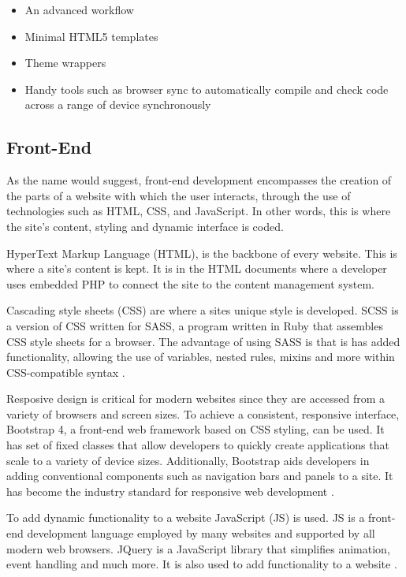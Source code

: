 \documentclass[fontsize=11pt]{extarticle}
\numberwithin{figure}{section} %
\providecommand{\tightlist}{%
  \setlength{\itemsep}{0pt}\setlength{\parskip}{0pt}}
\begin{document}
\begin{itemize}
\tightlist
\item
  An advanced workflow
\item
  Minimal HTML5 templates
\item
  Theme wrappers
\item
  Handy tools such as browser sync to automatically compile and check
  code across a range of device synchronously
\end{itemize}

\hypertarget{front-end}{%
\subsection{Front-End}\label{front-end}}

As the name would suggest, front-end development encompasses the
creation of the parts of a website with which the user interacts,
through the use of technologies such as HTML, CSS, and JavaScript. In
other words, this is where the site's content, styling and dynamic
interface is coded.

HyperText Markup Language (HTML), is the backbone of every website. This
is where a site's content is kept. It is in the HTML documents where a
developer uses embedded PHP to connect the site to the content
management system.

Cascading style sheets (CSS) are where a sites unique style is
developed. SCSS is a version of CSS written for SASS, a program written
in Ruby that assembles CSS style sheets for a browser. The advantage of
using SASS is that is has added functionality, allowing the use of
variables, nested rules, mixins and more within CSS-compatible syntax
\cite{p14}.

Resposive design is critical for modern websites since they are accessed
from a variety of browsers and screen sizes. To achieve a consistent,
responsive interface, Bootstrap 4, a front-end web framework based on
CSS styling, can be used. It has set of fixed classes that allow
developers to quickly create applications that scale to a variety of
device sizes. Additionally, Bootstrap aids developers in adding
conventional components such as navigation bars and panels to a site. It
has become the industry standard for responsive web development
\cite{p15}.

To add dynamic functionality to a website JavaScript (JS) is used. JS is
a front-end development language employed by many websites and supported
by all modern web browsers. JQuery is a JavaScript library that
simplifies animation, event handling and much more. It is also used to
add functionality to a website \cite{p16}.
\end{document}

